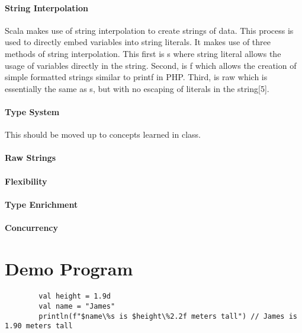 \documentclass[12pt]{article}
\begin{document}
		\paragraph{String Interpolation} Scala makes use of string interpolation to create strings of data. This process is used to directly embed variables into string literals. It makes use of three methods of string interpolation. This first is s where string literal allows the usage of variables directly in the string. Second, is f which allows the creation of simple formatted strings similar to printf in PHP. Third, is raw which is essentially the same as s, but with no escaping of literals in the string[5]. 


		\paragraph{Type System}This should be moved up to concepts learned in class.
		
		\paragraph{Raw Strings}

		\paragraph{Flexibility}

		\paragraph{Type Enrichment}

		\paragraph{Concurrency}

\section{Demo Program}
	\paragraph{}

	\begin{lstlisting}
		val height = 1.9d
		val name = "James"
		println(f"$name\%s is $height\%2.2f meters tall") // James is 1.90 meters tall
	\end{lstlisting}
\end{document}
